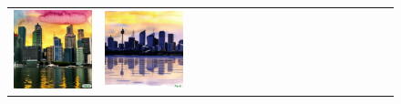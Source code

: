\begin{figure}[ht!]
\begin{adjustwidth}{-0.8in}{-0.5in}
\begin{tabular}{cccccccccccccccccccc}
\multicolumn{2}{c}{\includegraphics[width=\threebythreecolwidth\textwidth]{figures/cherries/ink_7_singapore.jpg}} &
\multicolumn{2}{c}{\includegraphics[width=\threebythreecolwidth\textwidth]{figures/cherries/ink_8_sydney.jpg}} &

\end{tabular}
\end{adjustwidth}
\end{figure}
